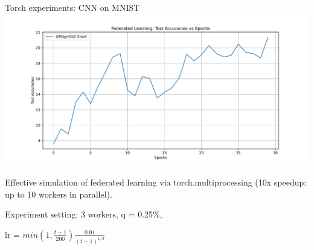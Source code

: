 \documentclass{beamer}
\begin{document}
\iffalse
\begin{frame}{Torch experiments: CNN on MNIST}
\includegraphics[width=1.0\textwidth]{test_accuracies_vs_epochs_comparison.pdf}

Effective simulation of federated learning via torch.multiprocessing (10x speedup: up to 10 workers in parallel).

Experiment setting: 3 workers, q = 0.25\%,

lr = $min(1, \frac{t+1}{200}) \frac{0.01}{(t + 1)^{1/3}}$
\end{frame}
\end{document}

